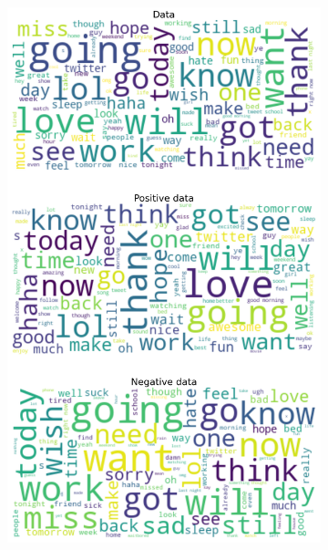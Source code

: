\documentclass{article}
\begin{document}
\begin{itemize}
\begin{figure}[H]
\begin{subfigure}[b]{0.24\textwidth}
\includegraphics[width=\textwidth]{chapter-06/section-01-01/08/visualization/2/wordcloud.png}
\end{subfigure}
\begin{subfigure}[b]{0.24\textwidth}
\centering

\end{subfigure}
\end{figure}
\end{itemize}
\end{document}
